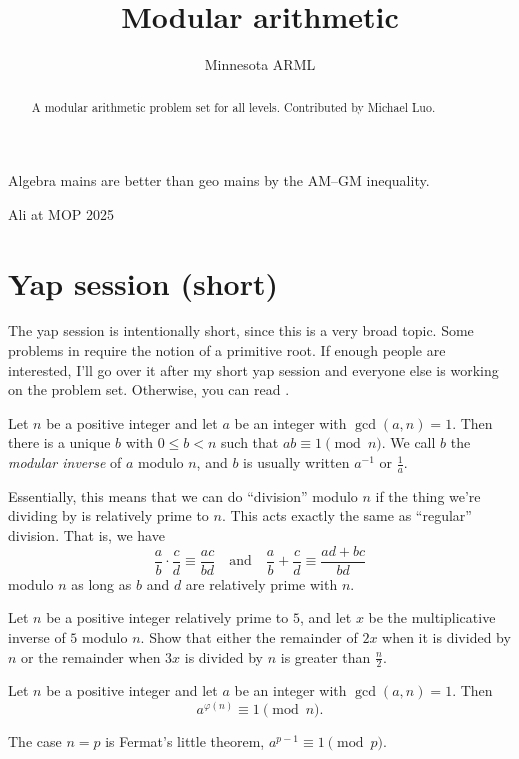 \documentclass[11pt]{scrartcl}
\author{Minnesota ARML}
\title{Modular arithmetic}
\begin{document}
\maketitle

\begin{abstract}
	A modular arithmetic problem set for all levels. Contributed by Michael Luo.
\end{abstract}

\epigraph{Algebra mains are better than geo mains by the AM--GM inequality.}{Ali at MOP 2025}

\section{Yap session (short)}

The yap session is intentionally short, since this is a very broad topic. Some problems in  require the notion of a primitive root. If enough people are interested, I'll go over it after my short yap session and everyone else is working on the problem set. Otherwise, you can read .

\begin{theorem}\label{thm:inverses} %
	Let $n$ be a positive integer and let $a$ be an integer with $\gcd(a,n) = 1$. Then there is a unique $b$ with $0 \le b < n$ such that $ab \equiv 1 \pmod n$. We call $b$ the \emph{modular inverse} of $a$ modulo $n$, and $b$ is usually written $a^{-1}$ or $\frac 1a$.
\end{theorem}

Essentially, this means that we can do ``division'' modulo $n$ if the thing we're dividing by is relatively prime to $n$. This acts exactly the same as ``regular'' division. That is, we have
\[\frac ab \cdot \frac cd \equiv \frac{ac}{bd} \quad \text{and} \quad \frac ab + \frac cd \equiv \frac{ad + bc}{bd}\]
modulo $n$ as long as $b$ and $d$ are relatively prime with $n$.

\begin{example}
	Let $n$ be a positive integer relatively prime to $5$, and let $x$ be the multiplicative inverse of $5$ modulo $n$. Show that either the remainder of $2x$ when it is divided by $n$ or the remainder when $3x$ is divided by $n$ is greater than $\frac n2$.
\end{example}

\begin{theorem}\label{thm:euler} %
	Let $n$ be a positive integer and let $a$ be an integer with $\gcd(a,n) = 1$. Then
	\[a^{\varphi(n)} \equiv 1 \pmod n.\]
\end{theorem}
The case $n = p$ is Fermat's little theorem, $a^{p - 1} \equiv 1 \pmod p$.
\end{document}
